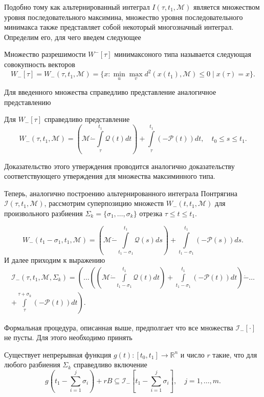 Подобно тому как альтернированный интеграл \( I(\tau, t_1, \mathcal{M}) \) является
 множеством уровня последовательного максимина, множество уровня последовательного минимакса
 также представляет собой некоторый многозначный интеграл. Определим его, для чего введем
 следующее
\begin{definition}
    Множество разрешимости \( W^-[\tau] \) минимаксоного типа называется следующая совокупность
     векторов
    \[
        W_-[\tau] = W_-(\tau, t_1, \mathcal{M}) = \{ x : \min_u \max_v d^2(x(t_1),
         \mathcal{M}) \le 0 \mid x(\tau) = x \}.
    \]
\end{definition}
Для введенного множества справедливо представление аналогичное представлению 
\begin{statement}
    Для \( W_-[\tau] \) справедливо представление
    \begin{equation}
        W_-(\tau, t_1, \mathcal{M}) = \left( \mathcal{M} \dot{-} \int\limits_{\tau}^{t_1}
         \mathcal{Q}(t) dt \right) + \int\limits_{\tau}^{t_1} (-\mathcal{P}(t)) dt, \quad 
         t_0 \le s \le t_1.
    \end{equation}
\end{statement}
Доказательство этого утверждения проводится аналогично доказательству соответствующего утверждения для
 множества максиминного типа.

Теперь, аналогично построению альтернированного интеграла Понтрягина \( \mathcal{I}(\tau, t_1,
 \mathcal{M}) \), рассмотрим суперпозицию множеств \( W_-(t, t_1, \mathcal{M}) \) для произвольного
 разбиения \( \Sigma_k = \{ \sigma_1, \dots, \sigma_k\} \) отрезка \( \tau \le t \le t_1 \).

\[
    W_-(t_1 - \sigma_1, t_1, \mathcal{M}) = \left( \mathcal{M} \dot{-} \int\limits_{t_1 - 
     \sigma_1}^{t_1} \mathcal{Q}(s) ds \right) + \int\limits_{t_1 - \sigma_1}^{t_1} (-\mathcal{P}(s))ds.
\]
И далее приходим к выражению
\begin{multline}\label{}
    \mathcal{I}_-(\tau, t_1, \mathcal{M}, \Sigma_k) = \left(\dots\left(\left(\mathcal{M} \dot{-}
     \int\limits_{t_1 - \sigma_1}^{t_1} \mathcal{Q}(t) dt \right) + \int\limits_{t_1 - 
     \sigma_1}^{t_1}(-\mathcal{P}(t)) dt \right) \dot{-} \dots \right. \\
    \left. + \int\limits_{\tau}^{\tau + \sigma_k} (-\mathcal{P}(t)) dt \right) .
\end{multline}

Формальная процедура, описанная выше, предполгает что все множества \( \mathcal{I}_-[\cdot]\) не пусты.
Для этого необходимо принять
\begin{assumption}
    Существует непрерывная функция \( g(t) : [t_0, t_1] \to \mathbb{R}^n \) и число \( r \) такие,
     что для любого разбиения \( \Sigma_k \) справедливо включение
    \[
        g \left(t_1 - \sum_{i = 1}^j \sigma_i \right) + rB \subseteq \mathcal{I}_-\left[ t_1 - 
         \sum_{i = 1}^j \sigma_i \right], \quad j = 1, \dots, m.
    \]
\end{assumption}

